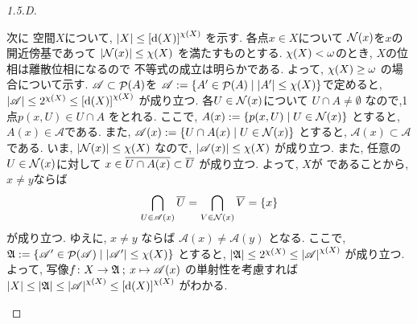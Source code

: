 \documentclass[uplatex, dvipdfmx, a4paper, 12pt, class=jsarticle, crop=false]{standalone}
\begin{document}
\begin{proof}[1.5.D]
\begin{enumerate}
		次に \Hausdorff 空間\( X \)について,
		\( \cardinality{X} \leq
		\lrbrack{\topdensity{X}}^{\topcharacter{X}} \)
		を示す.
		各点\( x \in X \)について
		\( \mathcal{N}\lrparen{x} \)を\( x \)の開近傍基であって
		\( \cardinality{\mathcal{N}\lrparen{x}} \leq \topcharacter{X} \)
		を満たすものとする.
		\( \topcharacter{X} < \omega \)のとき,
		\( X \)の位相は離散位相になるので
		不等式の成立は明らかである.
		よって, \( \topcharacter{X} \geq \omega \)
		の場合について示す.
		\( \mathscr{A} \subset \mathop{\mathcal{P}}\nolimits(A) \)を
		\( \mathscr{A} \defeq \setcomp{A' \in \pow(A)}
		{\cardinality{A'} \leq \topcharacter{X}} \)で定めると,
		\( \cardinality{\mathscr{A}}
		\leq 2^{\topcharacter{X}}
		\leq \lrbrack{\topdensity{X}}^{\topcharacter{X}} \)
		が成り立つ.
		各\( U \in \mathcal{N}\lrparen{x} \)について
		\( U \cap A \neq \emptyset \)
		なので,1点\( p(x, U) \in U \cap A \)
		をとれる.
		ここで, \( A(x) \defeq \setcomp{p(x, U)}
		{U \in \mathcal{N}\lrparen{x}} \)
		とすると, \( A(x) \in \mathscr{A} \)である.
		また,
		\( \mathscr{A}(x) \defeq \setcomp{U \cap A(x)}
		{U \in \mathcal{N}\lrparen{x}} \)
		とすると,
		\( \mathscr{A}(x) \subset \mathscr{A} \)
		である.
		いま, \( \cardinality{\mathcal{N}\lrparen{x}} \leq \topcharacter{X} \)
		なので,
		\( \cardinality{\mathscr{A}(x)} \leq \topcharacter{X}\)
		が成り立つ.
		また, 任意の\( U \in \mathcal{N}\lrparen{x} \)に対して
		\( x \in \overline{U \cap A(x)} \subset \overline{U} \)
		が成り立つ.
		よって, \( X \)が  であることから,
		\( x \neq y \)ならば
		\[ \bigcap_{U \in \mathscr{A}(x)} \topbar{U}
		= \bigcap_{V \in \mathcal{N}\lrparen{x}} \topbar{V}
		= \lrbrace{x} \]
		が成り立つ. ゆえに, \( x \neq y \)
		ならば
		\( \mathscr{A}(x) \neq \mathscr{A}(y) \)
		となる.
		ここで, \( \mathfrak{A} \defeq
		\setcomp{\mathscr{A}' \in \pow(\mathscr{A})}
		{\cardinality{\mathscr{A}'} \leq \topcharacter{X}} \)
		とすると,
		\( \cardinality{\mathfrak{A}} \leq 2^{\topcharacter{X}}
		\leq \cardinality{\mathscr{A}}^{\topcharacter{X}} \)
		が成り立つ.
		よって,
		写像\( f\colon X\to\mathfrak{A}\mathpunct{\: ; \:} x\mapsto\mathscr{A}(x) \)
		の単射性を考慮すれば
		\( \cardinality{X} \leq \cardinality{\mathfrak{A}}
		\leq \cardinality{\mathscr{A}}^{\topcharacter{X}}
		\leq \lrbrack{\topdensity{X}}^{\topcharacter{X}} \)
		がわかる.


\end{enumerate}
\end{proof}
\end{document}
